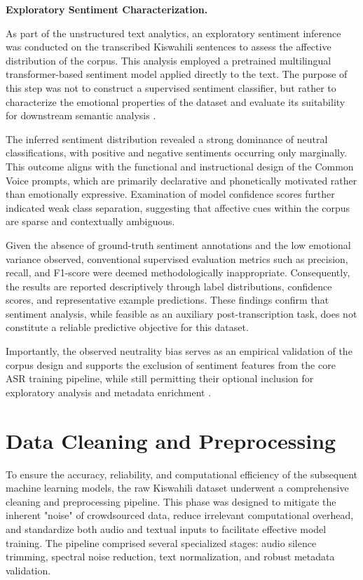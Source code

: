 \noindent\textbf{Exploratory Sentiment Characterization.}

As part of the unstructured text analytics, an exploratory sentiment inference was conducted on the transcribed Kiswahili sentences to assess the affective distribution of the corpus. This analysis employed a pretrained multilingual transformer-based sentiment model applied directly to the text. The purpose of this step was not to construct a supervised sentiment classifier, but rather to characterize the emotional properties of the dataset and evaluate its suitability for downstream semantic analysis \citep{Mabokela_Ngcobo_Masala_2025, Mabokela_Celik_Raborife_2023}.

The inferred sentiment distribution revealed a strong dominance of neutral classifications, with positive and negative sentiments occurring only marginally. This outcome aligns with the functional and instructional design of the Common Voice prompts, which are primarily declarative and phonetically motivated rather than emotionally expressive. Examination of model confidence scores further indicated weak class separation, suggesting that affective cues within the corpus are sparse and contextually ambiguous.

Given the absence of ground-truth sentiment annotations and the low emotional variance observed, conventional supervised evaluation metrics such as precision, recall, and F1-score were deemed methodologically inappropriate. Consequently, the results are reported descriptively through label distributions, confidence scores, and representative example predictions. These findings confirm that sentiment analysis, while feasible as an auxiliary post-transcription task, does not constitute a reliable predictive objective for this dataset.

Importantly, the observed neutrality bias serves as an empirical validation of the corpus design and supports the exclusion of sentiment features from the core ASR training pipeline, while still permitting their optional inclusion for exploratory analysis and metadata enrichment \citep{Mabokela_Ngcobo_Masala_2025}.

\section{Data Cleaning and Preprocessing}
To ensure the accuracy, reliability, and computational efficiency of the subsequent machine learning models, the raw Kiswahili dataset underwent a comprehensive cleaning and preprocessing pipeline. This phase was designed to mitigate the inherent "noise" of crowdsourced data, reduce irrelevant computational overhead, and standardize both audio and textual inputs to facilitate effective model training. The pipeline comprised several specialized stages: audio silence trimming, spectral noise reduction, text normalization, and robust metadata validation.

